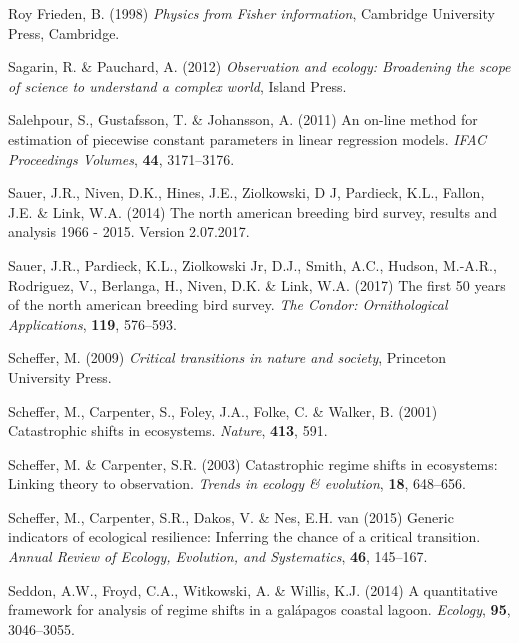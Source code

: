 \documentclass[12pt,twoside,openany]{reedthesis}
\begin{document}
\leavevmode\hypertarget{ref-frieden_physics_1998}{}%
Roy Frieden, B. (1998) \emph{Physics from Fisher information}, Cambridge University Press, Cambridge.

\leavevmode\hypertarget{ref-sagarin_observation_2012}{}%
Sagarin, R. \& Pauchard, A. (2012) \emph{Observation and ecology: Broadening the scope of science to understand a complex world}, Island Press.

\leavevmode\hypertarget{ref-salehpour2011line}{}%
Salehpour, S., Gustafsson, T. \& Johansson, A. (2011) An on-line method for estimation of piecewise constant parameters in linear regression models. \emph{IFAC Proceedings Volumes}, \textbf{44}, 3171--3176.

\leavevmode\hypertarget{ref-sauer2017results}{}%
Sauer, J.R., Niven, D.K., Hines, J.E., Ziolkowski, D J, Pardieck, K.L., Fallon, J.E. \& Link, W.A. (2014) The north american breeding bird survey, results and analysis 1966 - 2015. Version 2.07.2017.

\leavevmode\hypertarget{ref-sauer2017first}{}%
Sauer, J.R., Pardieck, K.L., Ziolkowski Jr, D.J., Smith, A.C., Hudson, M.-A.R., Rodriguez, V., Berlanga, H., Niven, D.K. \& Link, W.A. (2017) The first 50 years of the north american breeding bird survey. \emph{The Condor: Ornithological Applications}, \textbf{119}, 576--593.

\leavevmode\hypertarget{ref-scheffer_critical_2009}{}%
Scheffer, M. (2009) \emph{Critical transitions in nature and society}, Princeton University Press.

\leavevmode\hypertarget{ref-scheffer_catastrophic_2001}{}%
Scheffer, M., Carpenter, S., Foley, J.A., Folke, C. \& Walker, B. (2001) Catastrophic shifts in ecosystems. \emph{Nature}, \textbf{413}, 591.

\leavevmode\hypertarget{ref-scheffer2003catastrophic}{}%
Scheffer, M. \& Carpenter, S.R. (2003) Catastrophic regime shifts in ecosystems: Linking theory to observation. \emph{Trends in ecology \& evolution}, \textbf{18}, 648--656.

\leavevmode\hypertarget{ref-scheffer2015generic}{}%
Scheffer, M., Carpenter, S.R., Dakos, V. \& Nes, E.H. van (2015) Generic indicators of ecological resilience: Inferring the chance of a critical transition. \emph{Annual Review of Ecology, Evolution, and Systematics}, \textbf{46}, 145--167.

\leavevmode\hypertarget{ref-seddon2014quantitative}{}%
Seddon, A.W., Froyd, C.A., Witkowski, A. \& Willis, K.J. (2014) A quantitative framework for analysis of regime shifts in a galápagos coastal lagoon. \emph{Ecology}, \textbf{95}, 3046--3055.
\end{document}
